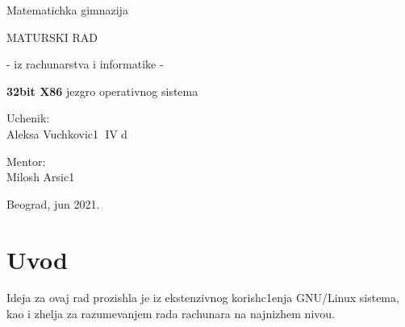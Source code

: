 \documentclass[a4paper,fleqn,12pt]{JMThesis}
\newcommand\eng{\fontencoding{OT1}\fontfamily{\rmdefault}\selectfont}
\begin{document}
\thispagestyle{empty}

\begin{center}
{\matematicka Matematichka gimnazija}
\end{center}
\vspace*{50mm}

\begin{center}
{\maturski MATURSKI RAD}

\vspace*{8pt}
{\naslov - iz rachunarstva i informatike -}
\end{center}

\vspace*{10pt}
\begin{center}
    {\naslov \textbf{\eng\Large 32bit X86} jezgro operativnog sistema}
\end{center}

\vspace*{70mm}
\setlength{\columnsep}{50pt}
\begin{multicols}{2}
 {\noindent \imen Uchenik:
\\Aleksa Vuchkovic1  $\operatorname{IV}$d}


{ \noindent \hfill \imen Mentor:\\
\hfill \phantom{aaaaaaaa} Milosh Arsic1}
\end{multicols}

\vfill
\begin{center}
{\imen Beograd, jun 2021.}
\end{center}
\clearpage

\thispagestyle{empty}
\mbox{}
\clearpage


\renewcommand{\contentsname}{Sadrzhaj}
\thispagestyle{empty}


\tableofcontents \clearpage

\thispagestyle{empty}
\mbox{}
\clearpage

\renewcommand{\chaptername}{}
\setcounter{page}{1}

\chapter{Uvod}
\bigskip

Ideja za ovaj rad prozishla je iz ekstenzivnog korish\/c1enja {\eng GNU/Linux}
sistema, kao i zhelja za razumevanjem rada rachunara na najnizhem nivou.
\end{document}
